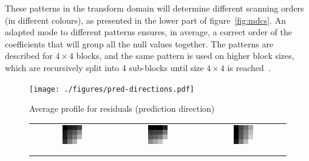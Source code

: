 \documentclass[11pt,a4paper,openright,twoside]{book}
\numberwithin{equation}{section} %
\numberwithin{figure}{section} %
\numberwithin{table}{section} %
\begin{document}
These patterns in the transform domain will determine different scanning
orders (in different colours), as presented in the lower part of
figure~\ref{fig:mdcs}.
An adapted mode to different patterns ensures, in average, a correct order of
the coefficients that will group all the null values together.
The patterns are described for $4\times4$ blocks, and the same pattern is used
on higher block sizes, which are recursively split into 4 sub-blocks until
size $4\times4$ is reached~\cite{sole-12-transform-coefficient-coding}.

\begin{figure}[tb]
	\centering
	\begin{minipage}{0.48\textwidth}
		\texttt{[image: ./figures/pred-directions.pdf]}
	\end{minipage}
	\begin{minipage}{0.48\textwidth}
		\centering
		\small
		Average profile for residuals (prediction direction)
		\begin{tabular}[H]{ccc}
			\includegraphics[width=0.25\textwidth]{figures/resids-scan-diag.png}
			&
			\includegraphics[width=0.25\textwidth]{figures/resids-scan-horz.png}
			&
			\includegraphics[width=0.25\textwidth]{figures/resids-scan-vert.png}
			\\
			\color{red}{diagonal} & \color{greenish}{vertical} & \color{blue}{horizontal} \\
			& & \\
		\end{tabular}

\end{minipage}
\end{figure}
\end{document}
